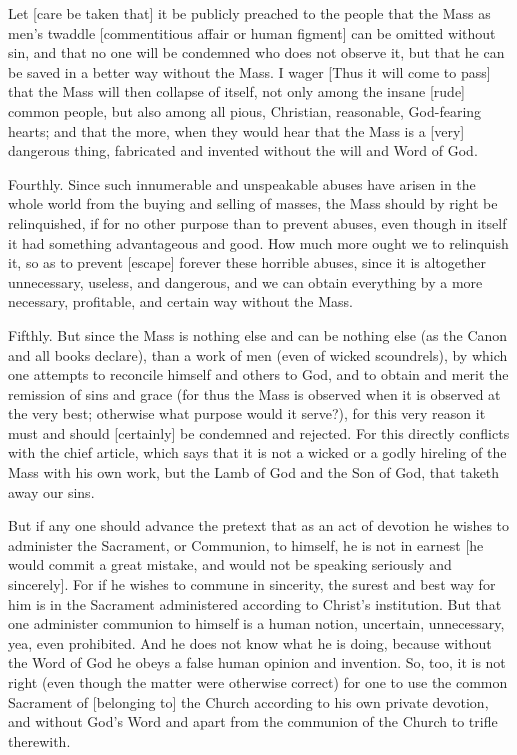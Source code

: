 Let [care be taken that] it be publicly preached to the people
that the Mass as men's twaddle [commentitious affair or human
figment] can be omitted without sin, and that no one will be
condemned who does not observe it, but that he can be saved in
a better way without the Mass. I wager [Thus it will come to
pass] that the Mass will then collapse of itself, not only
among the insane [rude] common people, but also among all
pious, Christian, reasonable, God-fearing hearts; and that the
more, when they would hear that the Mass is a [very] dangerous
thing, fabricated and invented without the will and Word of
God.

Fourthly. Since such innumerable and unspeakable abuses have
arisen in the whole world from the buying and selling of
masses, the Mass should by right be relinquished, if for no
other purpose than to prevent abuses, even though in itself it
had something advantageous and good. How much more ought we to
relinquish it, so as to prevent [escape] forever these
horrible abuses, since it is altogether unnecessary, useless,
and dangerous, and we can obtain everything by a more
necessary, profitable, and certain way without the Mass.

Fifthly. But since the Mass is nothing else and can be nothing
else (as the Canon and all books declare), than a work of men
(even of wicked scoundrels), by which one attempts to
reconcile himself and others to God, and to obtain and merit
the remission of sins and grace (for thus the Mass is observed
when it is observed at the very best; otherwise what purpose
would it serve?), for this very reason it must and should
[certainly] be condemned and rejected. For this directly
conflicts with the chief article, which says that it is not a
wicked or a godly hireling of the Mass with his own work, but
the Lamb of God and the Son of God, that taketh away our sins.

But if any one should advance the pretext that as an act of
devotion he wishes to administer the Sacrament, or Communion,
to himself, he is not in earnest [he would commit a great
mistake, and would not be speaking seriously and sincerely].
For if he wishes to commune in sincerity, the surest and best
way for him is in the Sacrament administered according to
Christ's institution. But that one administer communion to
himself is a human notion, uncertain, unnecessary, yea, even
prohibited. And he does not know what he is doing, because
without the Word of God he obeys a false human opinion and
invention. So, too, it is not right (even though the matter
were otherwise correct) for one to use the common Sacrament of
[belonging to] the Church according to his own private
devotion, and without God's Word and apart from the communion
of the Church to trifle therewith.

